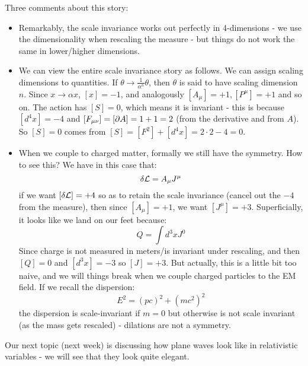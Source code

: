 Three comments about this story:
\begin{itemize}
    \item Remarkably, the scale invariance works out perfectly in 4-dimensions - we use the dimensionality when rescaling the measure - but things do not work the same in lower/higher dimensions.
    \item We can view the entire scale invariance story as follows. We can assign scaling dimensions to quantities. If $\theta \to \frac{1}{\alpha^n}\theta$, then $\theta$ is said to have scaling dimension $n$. Since $x \to \alpha x$, $[x] = -1$, and analogously $[A_\mu] = +1, [P^\mu] = +1$ and so on. The action has $[S] = 0$, which means it is invariant - this is because $[d^4x] = -4$ and $[F_{\mu\nu}] = [\partial A] = 1 + 1 = 2$ (from the derivative and from $A$). So $[S] = 0$ comes from $[S] = [F^2] + [d^4x] = 2 \cdot 2 - 4 = 0$.
    \item When we couple to charged matter, formally we still have the symmetry. How to see this? We have in this case that:
    \begin{equation}
        \delta \mathcal{L} = A_\mu J^\mu
    \end{equation}
    if we want $[\delta \mathcal{L}] = +4$ so as to retain the scale invariance (cancel out the $-4$ from the measure), then since $[A_\mu] = +1$, we want $[J^\mu] = +3$. Superficially, it looks like we land on our feet because:
    \begin{equation}
        Q =  \int d^3x J^0
    \end{equation}
    Since charge is not measured in meters/is invariant under rescaling, and then $[Q] = 0$ and $[d^3x] = -3$ so $[J] = +3$. But actually, this is a little bit too naive, and we will things break when we couple charged particles to the EM field. If we recall the dispersion:
    \begin{equation}
        E^2 = (pc)^2 + (mc^2)^2
    \end{equation}
    the dispersion is scale-invariant if $m = 0$ but otherwise is not scale invariant (as the mass gets rescaled) - dilations are not a symmetry.
\end{itemize}

Our next topic (next week) is discussing how plane waves look like in relativistic variables - we will see that they look quite elegant.